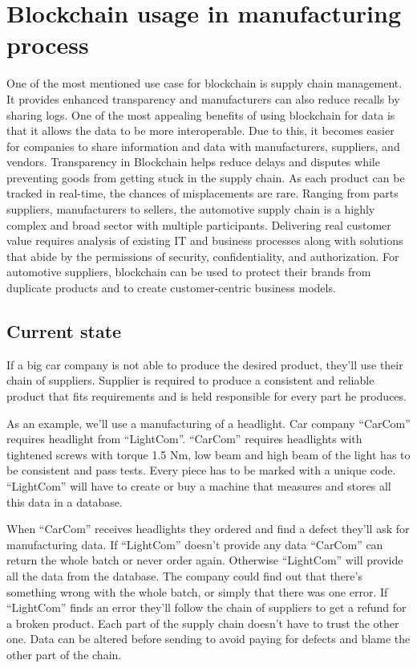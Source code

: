 \section{Blockchain usage in manufacturing process}
One of the most mentioned use case for blockchain is supply chain management. It provides enhanced transparency and manufacturers can also reduce recalls by sharing logs. One of the most appealing benefits of using blockchain for data is that it allows the data to be more interoperable. Due to this, it becomes easier for companies to share information and data with manufacturers, suppliers, and vendors. Transparency in Blockchain helps reduce delays and disputes while preventing goods from getting stuck in the supply chain. As each product can be tracked in real-time, the chances of misplacements are rare. Ranging from parts suppliers, manufacturers to sellers, the automotive supply chain is a highly complex and broad sector with multiple participants. Delivering real customer value requires analysis of existing IT and business processes along with solutions that abide by the permissions of security, confidentiality, and authorization. For automotive suppliers, blockchain can be used to protect their brands from duplicate products and to create customer-centric business models. \cite{supply_chain}

\subsection{Current state}
If a big car company is not able to produce the desired product, they'll use their chain of suppliers. Supplier is required to produce a consistent and reliable product that fits requirements and is held responsible for every part he produces. 

As an example, we'll use a manufacturing of a headlight. Car company ``CarCom'' requires headlight from ``LightCom''. ``CarCom'' requires headlights with tightened screws with torque 1.5 Nm, low beam and high beam of the light has to be consistent and pass tests. Every piece has to be marked with a unique code. ``LightCom'' will have to create or buy a machine that measures and stores all this data in a database.

When ``CarCom'' receives headlights they ordered and find a defect they'll ask for manufacturing data. If ``LightCom'' doesn't provide any data ``CarCom'' can return the whole batch or never order again. Otherwise ``LightCom'' will provide all the data from the database. The company could find out that there's something wrong with the whole batch, or simply that there was one error. If ``LightCom'' finds an error they'll follow the chain of suppliers to get a refund for a broken product. Each part of the supply chain doesn't have to trust the other one. Data can be altered before sending to avoid paying for defects and blame the other part of the chain. 

